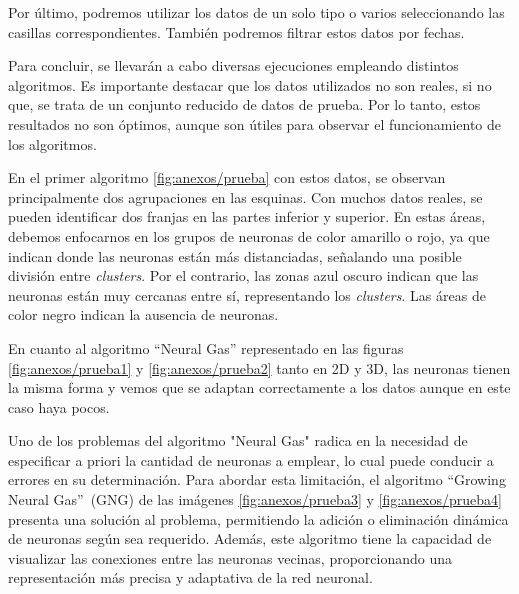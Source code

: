 
Por último, podremos utilizar los datos de un solo tipo o varios seleccionando las casillas correspondientes. También podremos filtrar estos datos por fechas.


Para concluir, se llevarán a cabo diversas ejecuciones empleando distintos algoritmos. Es importante destacar que los datos utilizados no son reales, si no que, se trata de un conjunto reducido de datos de prueba. Por lo tanto, estos resultados no son óptimos, aunque son útiles para observar el funcionamiento de los algoritmos.

En el primer algoritmo \ref{fig:anexos/prueba} con estos datos, se observan principalmente dos agrupaciones en las esquinas. Con muchos datos reales, se pueden identificar dos franjas en las partes inferior y superior. En estas áreas, debemos enfocarnos en los grupos de neuronas de color amarillo o rojo, ya que indican donde las neuronas están más distanciadas, señalando una posible división entre \emph{clusters}. Por el contrario, las zonas azul oscuro indican que las neuronas están muy cercanas entre sí, representando los \emph{clusters}. Las áreas de color negro indican la ausencia de neuronas.


En cuanto al algoritmo ``Neural Gas'' representado en las figuras \ref{fig:anexos/prueba1} y \ref{fig:anexos/prueba2} tanto en 2D y 3D, las neuronas tienen la misma forma y vemos que se adaptan correctamente a los datos aunque en este caso haya pocos.


Uno de los problemas del algoritmo "Neural Gas" radica en la necesidad de especificar a priori la cantidad de neuronas a emplear, lo cual puede conducir a errores en su determinación. Para abordar esta limitación, el algoritmo ``Growing Neural Gas''~(GNG) de las imágenes \ref{fig:anexos/prueba3} y \ref{fig:anexos/prueba4} presenta una solución al problema, permitiendo la adición o eliminación dinámica de neuronas según sea requerido. Además, este algoritmo tiene la capacidad de visualizar las conexiones entre las neuronas vecinas, proporcionando una representación más precisa y adaptativa de la red neuronal.

